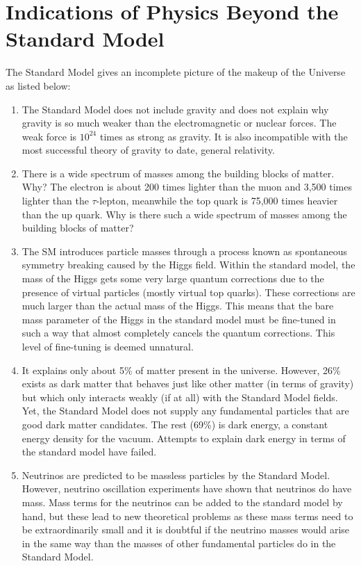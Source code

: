 \section{Indications of Physics Beyond the Standard Model}

The Standard Model gives an incomplete picture of the makeup of the Universe as listed below:

\begin{enumerate}
	\item{The Standard Model does not include gravity and does not explain why gravity is so much weaker than the electromagnetic or nuclear forces\cite{hierarchy}. The weak force is $10^{24}$ times as strong as gravity. It is also incompatible with the most successful theory of gravity to date, general relativity\cite{GR1,GR2}.}
	\item{There is a wide spectrum of masses among the building blocks of matter\cite{massHierarchy}. Why? The electron is about 200 times lighter than the muon and 3,500 times lighter than the $\tau$-lepton, meanwhile the top quark is 75,000 times heavier than the up quark. Why is there such a wide spectrum of masses among the building blocks of matter?}
	\item{The SM introduces particle masses through a process known as spontaneous symmetry breaking\cite{SSB1,SSB2,SSB3} caused by the Higgs field. Within the standard model, the mass of the Higgs gets some very large quantum corrections due to the presence of virtual particles (mostly virtual top quarks). These corrections are much larger than the actual mass of the Higgs. This means that the bare mass parameter of the Higgs in the standard model must be fine-tuned in such a way that almost completely cancels the quantum corrections. This level of fine-tuning is deemed unnatural.}
	\item{It explains only about 5\% of matter  present in the universe. However, 26\% exists as dark matter\cite{WIMP} that behaves just like other matter (in terms of gravity) but which only interacts weakly (if at all) with the Standard Model fields. Yet, the Standard Model does not supply any fundamental particles that are good dark matter candidates. The rest (69\%) is dark energy\cite{DarkEnergy}, a constant energy density for the vacuum. Attempts to explain dark energy in terms of the standard model have failed.}
	\item{Neutrinos are predicted to be massless particles by the Standard Model\cite{NuMass}. However, neutrino oscillation experiments have shown that neutrinos do have mass\cite{NuMass1,NuMass2}. Mass terms for the neutrinos can be added to the standard model by hand, but these lead to new theoretical problems as these mass terms need to be extraordinarily small and it is doubtful if the neutrino masses would arise in the same way than the masses of other fundamental particles do in the Standard Model.}

\end{enumerate}
